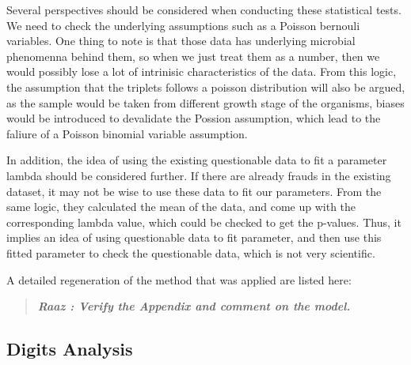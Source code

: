 \documentclass{article}
\begin{document}
Several perspectives should be considered when conducting these
statistical tests. We need to check the underlying assumptions such as a
Poisson bernouli variables. One thing to note is that those data has
underlying microbial phenomenna behind them, so when we just treat them
as a number, then we would possibly lose a lot of intrinisic
characteristics of the data. From this logic, the assumption that the
triplets follows a poisson distribution will also be argued, as the
sample would be taken from different growth stage of the organisms,
biases would be introduced to devalidate the Possion assumption, which
lead to the faliure of a Poisson binomial variable assumption.

In addition, the idea of using the existing questionable data to fit a
parameter lambda should be considered further. If there are already
frauds in the existing dataset, it may not be wise to use these data to
fit our parameters. From the same logic, they calculated the mean of the
data, and come up with the corresponding lambda value, which could be
checked to get the p-values. Thus, it implies an idea of using
questionable data to fit parameter, and then use this fitted parameter
to check the questionable data, which is not very scientific.

A detailed regeneration of the method that was applied are listed here:

\begin{quote}
\textbf{\emph{Raaz : Verify the Appendix and comment on the model. }}
\end{quote}

    \subsection{Digits Analysis}\label{digits-analysis}
\end{document}
